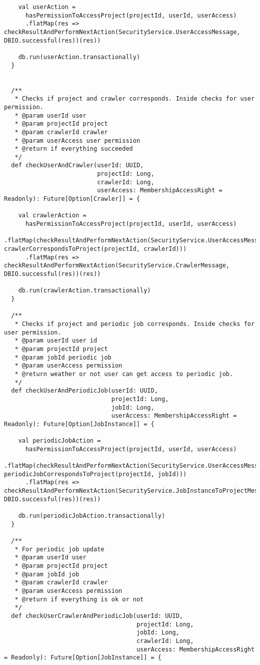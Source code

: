 \begin{lstlisting}
    val userAction =
      hasPermissionToAccessProject(projectId, userId, userAccess)
      .flatMap(res => checkResultAndPerformNextAction(SecurityService.UserAccessMessage, DBIO.successful(res))(res))

    db.run(userAction.transactionally)
  }


  /**
   * Checks if project and crawler corresponds. Inside checks for user permission.
   * @param userId user
   * @param projectId project
   * @param crawlerId crawler
   * @param userAccess user permission
   * @return if everything succeeded
   */
  def checkUserAndCrawler(userId: UUID,
                          projectId: Long,
                          crawlerId: Long,
                          userAccess: MembershipAccessRight = Readonly): Future[Option[Crawler]] = {

    val crawlerAction =
      hasPermissionToAccessProject(projectId, userId, userAccess)
      .flatMap(checkResultAndPerformNextAction(SecurityService.UserAccessMessage, crawlerCorrespondsToProject(projectId, crawlerId)))
      .flatMap(res => checkResultAndPerformNextAction(SecurityService.CrawlerMessage, DBIO.successful(res))(res))

    db.run(crawlerAction.transactionally)
  }

  /**
   * Checks if project and periodic job corresponds. Inside checks for user permission.
   * @param userId user id
   * @param projectId project
   * @param jobId periodic job
   * @param userAccess permission
   * @return weather or not user can get access to periodic job.
   */
  def checkUserAndPeriodicJob(userId: UUID,
                              projectId: Long,
                              jobId: Long,
                              userAccess: MembershipAccessRight = Readonly): Future[Option[JobInstance]] = {

    val periodicJobAction =
      hasPermissionToAccessProject(projectId, userId, userAccess)
      .flatMap(checkResultAndPerformNextAction(SecurityService.UserAccessMessage, periodicJobCorrespondsToProject(projectId, jobId)))
      .flatMap(res => checkResultAndPerformNextAction(SecurityService.JobInstanceToProjectMessage, DBIO.successful(res))(res))

    db.run(periodicJobAction.transactionally)
  }

  /**
   * For periodic job update
   * @param userId user
   * @param projectId project
   * @param jobId job
   * @param crawlerId crawler
   * @param userAccess permission
   * @return if everything is ok or not
   */
  def checkUserCrawlerAndPeriodicJob(userId: UUID,
                                     projectId: Long,
                                     jobId: Long,
                                     crawlerId: Long,
                                     userAccess: MembershipAccessRight = Readonly): Future[Option[JobInstance]] = {


\end{lstlisting}
